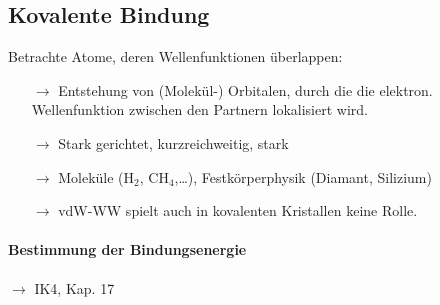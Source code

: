 \subsection{Kovalente Bindung} \label{kap:1_4} %
Betrachte Atome, deren Wellenfunktionen überlappen:
\begin{itemize}
	\item[$\rightarrow$] Entstehung von (Molekül-) Orbitalen, durch die die elektron. Wellenfunktion zwischen den Partnern lokalisiert wird.
	\item[$\rightarrow$] Stark gerichtet, kurzreichweitig, stark
	\item[$\rightarrow$] Moleküle (H$_2$, CH$_4$,\dots), Festkörperphysik (Diamant, Silizium)
	\item[$\rightarrow$] vdW-WW spielt auch in kovalenten Kristallen keine Rolle. 
\end{itemize}
\paragraph{Bestimmung der Bindungsenergie}
$\rightarrow$ IK4, Kap. 17
